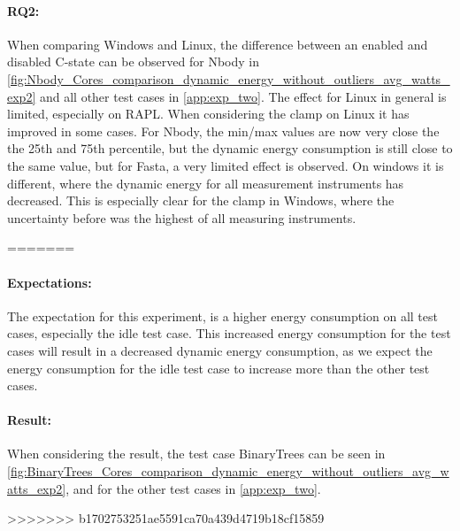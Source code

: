 \paragraph*{RQ2:} When comparing Windows and Linux, the difference between an enabled and disabled C-state can be observed for Nbody in \cref{fig:Nbody_Cores_comparison_dynamic_energy_without_outliers_avg_watts_exp2} and all other test cases in \cref{app:exp_two}. The effect for Linux in general is limited, especially on RAPL. When considering the clamp on Linux it has improved in some cases. For Nbody, the min/max values are now very close the the 25th and 75th percentile, but the dynamic energy consumption is still close to the same value, but for Fasta, a very limited effect is observed. On windows it is different, where the dynamic energy for all measurement instruments has decreased. This is especially clear for the clamp in Windows, where the uncertainty before was the highest of all measuring instruments.


% 

=======
\paragraph*{Expectations:} The expectation for this experiment, is a higher energy consumption on all test cases, especially the idle test case. This increased energy consumption for the test cases will result in a decreased dynamic energy consumption, as we expect the energy consumption for the idle test case to increase more than the other test cases.

\paragraph*{Result:} When considering the result, the test case BinaryTrees can be seen in \cref{fig:BinaryTrees_Cores_comparison_dynamic_energy_without_outliers_avg_watts_exp2}, and for the other test cases in \cref{app:exp_two}.


%
%
>>>>>>> b1702753251ae5591ca70a439d4719b18cf15859
